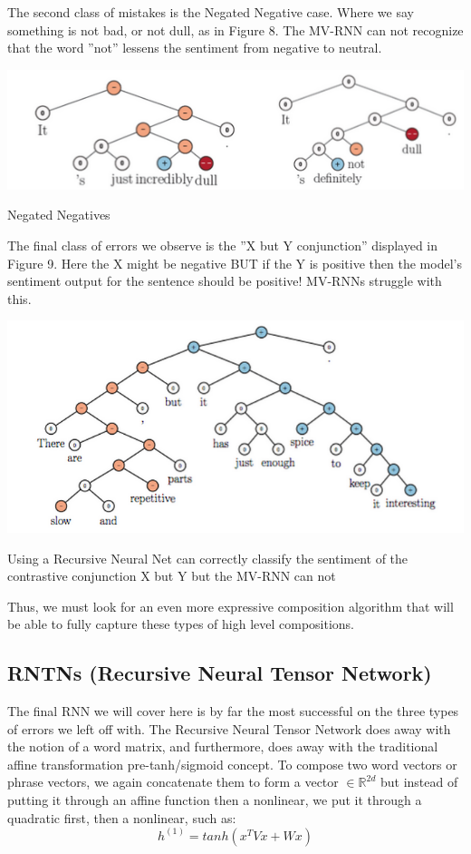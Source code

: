 \documentclass{tufte-handout}
\begin{document}
The second class of mistakes is the Negated Negative case. Where we say something is not bad, or not dull, as in Figure 8. The MV-RNN can not recognize that the word ''not'' lessens the sentiment from negative to neutral.


\begin{marginfigure}%
  \includegraphics[width=\linewidth]{img8}
  \caption{Negated Negatives}
  \label{fig:img8}
\end{marginfigure}

The final class of errors we observe is the ''X but Y conjunction'' displayed in Figure 9. Here the X might be negative BUT if the Y is positive then the model's sentiment output for the sentence should be positive! MV-RNNs struggle with this.

\begin{marginfigure}%
  \includegraphics[width=\linewidth]{img9}
  \caption{Using a Recursive Neural Net can correctly classify the sentiment of the contrastive conjunction X but Y but the MV-RNN can not}
  \label{fig:img9}
\end{marginfigure}

Thus, we must look for an even more expressive composition algorithm that will be able to fully capture these types of high level compositions.

\subsection{RNTNs (Recursive Neural Tensor Network)}

The final RNN we will cover here is by far the most successful on the three types of errors we left off with. The Recursive Neural Tensor Network does away with the notion of a word matrix, and furthermore, does away with the traditional affine transformation pre-tanh/sigmoid concept. To compose two word vectors or phrase vectors, we again concatenate them to form a vector $\in \mathbb{R}^{2d}$ but instead of putting it through an affine function then a nonlinear, we put it through a quadratic first, then a nonlinear, such as:
\begin{equation}
h^{(1)} = tanh(x^T V x + Wx)
\end{equation}
\end{document}
